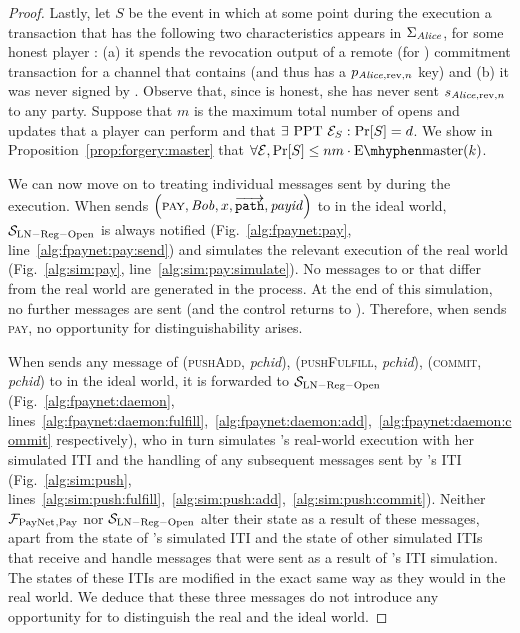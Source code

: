 \begin{proof}
  Lastly, let $S$ be the event in which at some point during the execution a
  transaction that has the following two characteristics appears in
  $\Sigma_{\mathit{Alice}}$, for some honest player \alice: (a) it spends the revocation
  output of a remote (for \alice{}) commitment transaction for a channel that
  contains \alice{} (and thus has a $p_{\mathit{Alice}, \mathrm{rev}, n}$ key) and (b)
  it was never signed by \alice. Observe that, since \alice{} is honest, she has
  never sent $s_{\mathit{Alice}, \mathrm{rev}, n}$ to any party. Suppose that $m$ is the
  maximum total number of opens and updates that a player can perform and that
  $\exists \text{ PPT } \mathcal{E}_S: \Pr[S] = d$. We show in
  Proposition~\ref{prop:forgery:master} that $\forall \environment, \Pr[S] \leq
  nm \cdot \mathrm{E \mhyphen master}(k)$.

  We can now move on to treating individual messages sent by \environment{}
  during the execution. When \environment{} sends $\left(\textsc{pay}, \mathit{Bob}, x,
  \overrightarrow{\mathtt{path}}, \mathit{payid}\right)$ to \alice{} in the
  ideal world, $\mathcal{S}_{\mathrm{LN - Reg - Open}}$ is always notified
  (Fig.~\ref{alg:fpaynet:pay}, line~\ref{alg:fpaynet:pay:send}) and simulates
  the relevant execution of the real world (Fig.~\ref{alg:sim:pay},
  line~\ref{alg:sim:pay:simulate}). No messages to \ledger{} or \environment{}
  that differ from the real world are generated in the process. At the end of
  this simulation, no further messages are sent (and the control returns to
  \environment). Therefore, when \environment{} sends \textsc{pay}, no
  opportunity for distinguishability arises.

  When \environment{} sends any message of (\textsc{pushAdd}, \textit{pchid}),
  (\textsc{pushFulfill}, \textit{pchid}), (\textsc{commit}, \textit{pchid}) to
  \alice{} in the ideal world, it is forwarded to $\mathcal{S}_{\mathrm{LN - Reg
  - Open}}$ (Fig.~\ref{alg:fpaynet:daemon},
  lines~\ref{alg:fpaynet:daemon:fulfill},~\ref{alg:fpaynet:daemon:add},~\ref{alg:fpaynet:daemon:commit}
  respectively), who in turn simulates \alice's real-world execution with her
  simulated ITI and the handling of any subsequent messages sent by \alice's ITI
  (Fig.~\ref{alg:sim:push},
  lines~\ref{alg:sim:push:fulfill},~\ref{alg:sim:push:add},~\ref{alg:sim:push:commit}).
  Neither $\mathcal{F}_{\mathrm{PayNet}}{}_{\mathrm{, Pay}}$ nor $\mathcal{S}_{\mathrm{LN - Reg -
  Open}}$ alter their state as a result of these messages, apart from the state
  of \alice's simulated ITI and the state of other simulated ITIs that receive
  and handle messages that were sent as a result of \alice's ITI simulation. The
  states of these ITIs are modified in the exact same way as they would in the
  real world. We deduce that these three messages do not introduce any
  opportunity for \environment{} to distinguish the real and the ideal world.


\end{proof}
